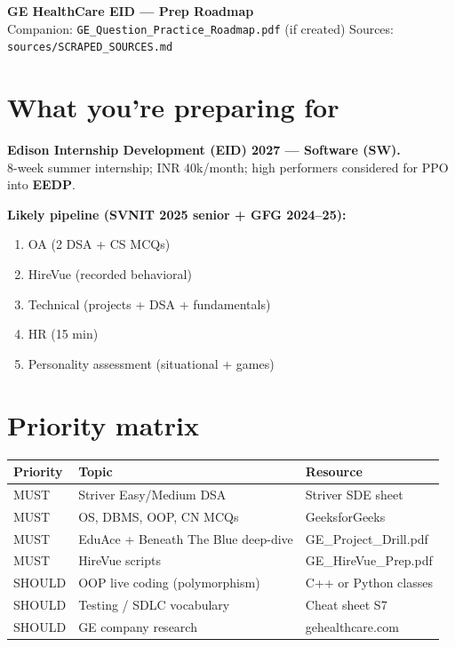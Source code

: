 \documentclass[11pt,a4paper]{article}
\begin{document}
\begin{center}
  {\LARGE\bfseries GE HealthCare EID --- Prep Roadmap}\\[4pt]
  {\small Companion: \texttt{GE\_Question\_Practice\_Roadmap.pdf} (if created) \textbar{} Sources: \texttt{sources/SCRAPED\_SOURCES.md}}
\end{center}

\section{What you're preparing for}
\textbf{Edison Internship Development (EID) 2027 --- Software (SW).}\\
8-week summer internship; INR 40k/month; high performers considered for PPO into \textbf{EEDP}.

\textbf{Likely pipeline (SVNIT 2025 senior + GFG 2024--25):}
\begin{enumerate}
  \item OA (2 DSA + CS MCQs)
  \item HireVue (recorded behavioral)
  \item Technical (projects + DSA + fundamentals)
  \item HR (15 min)
  \item Personality assessment (situational + games)
\end{enumerate}

\section{Priority matrix}
\noindent\begin{tabular}{|l|l|l|}
\hline
\textbf{Priority} & \textbf{Topic} & \textbf{Resource} \\
\hline
\textcolor{must}{MUST} & Striver Easy/Medium DSA & Striver SDE sheet \\
\textcolor{must}{MUST} & OS, DBMS, OOP, CN MCQs & GeeksforGeeks \\
\textcolor{must}{MUST} & EduAce + Beneath The Blue deep-dive & GE\_Project\_Drill.pdf \\
\textcolor{must}{MUST} & HireVue scripts & GE\_HireVue\_Prep.pdf \\
\textcolor{should}{SHOULD} & OOP live coding (polymorphism) & C++ or Python classes \\
\textcolor{should}{SHOULD} & Testing / SDLC vocabulary & Cheat sheet S7 \\
\textcolor{should}{SHOULD} & GE company research & gehealthcare.com \\
\hline
\end{tabular}
\end{document}

